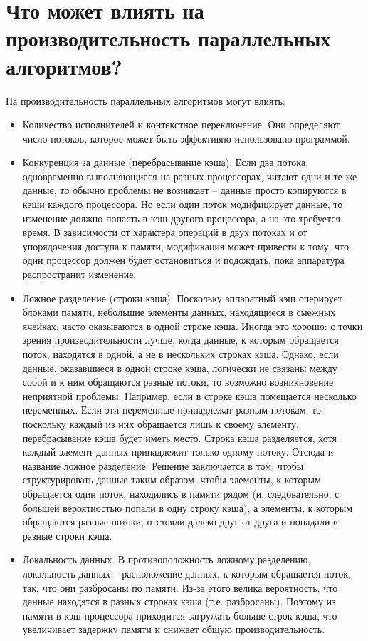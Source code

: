 \documentclass[a4paper,12pt]{article}	%
\begin{document}
\section{Что может влиять на производительность параллельных алгоритмов?}

	На производительность параллельных алгоритмов могут влиять:
	
	\begin{itemize}
	
		\item Количество исполнителей и контекстное переключение. Они определяют число потоков, которое может быть эффективно использовано программой.
		
		\item Конкуренция за данные (перебрасывание кэша). Если два потока, одновременно выполняющиеся на разных процессорах, читают одни и те же данные, то обычно проблемы не возникает -- данные просто копируются в кэши каждого процессора. Но если один поток модифицирует данные, то изменение должно попасть в кэш другого процессора, а на это требуется время. В зависимости от характера операций в двух потоках и от упорядочения доступа к памяти, модификация может привести к тому, что один процессор должен будет остановиться и подождать, пока аппаратура распространит изменение.
		
		\item Ложное разделение (строки кэша). Поскольку аппаратный кэш оперирует блоками памяти, небольшие элементы данных, находящиеся в смежных ячейках, часто оказываются в одной строке кэша. Иногда это хорошо: с точки зрения производительности лучше, когда данные, к которым обращается поток, находятся в одной, а не в нескольких строках кэша. Однако, если данные, оказавшиеся в одной строке кэша, логически не связаны между собой и к ним обращаются разные потоки, то возможно возникновение неприятной проблемы. Например, если в строке кэша помещается несколько переменных. Если эти переменные принадлежат разным потокам, то поскольку каждый из них обращается лишь к своему элементу, перебрасывание кэша будет иметь место. Строка кэша разделяется, хотя каждый элемент данных принадлежит только одному потоку. Отсюда и название ложное разделение. Решение заключается в том, чтобы структурировать данные таким образом, чтобы элементы, к которым обращается один поток, находились в памяти рядом (и, следовательно, с большей вероятностью попали в одну строку кэша), а элементы, к которым обращаются разные потоки, отстояли далеко друг от друга и попадали в разные строки кэша.
		
		\item Локальность данных. В противоположность ложному разделению, локальность данных -- расположение данных, к которым обращается поток, так, что они разбросаны по памяти. Из-за этого велика вероятность, что данные находятся в разных строках кэша (т.е. разбросаны). Поэтому из памяти в кэш процессора приходится загружать больше строк кэша, что увеличивает задержку памяти и снижает общую производительность.
	
	\end{itemize}
	
\end{document}
